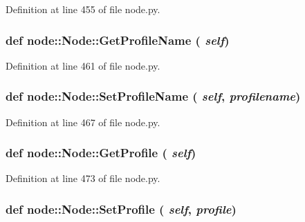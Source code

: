 Definition at line 455 of file node.py.\hypertarget{classnode_1_1Node_20edc3356c0700d5513dfddb4c882ee2}{
\subsubsection[GetProfileName]{\setlength{\rightskip}{0pt plus 5cm}def node::Node::Get\-Profile\-Name ( {\em self})}}
\label{classnode_1_1Node_20edc3356c0700d5513dfddb4c882ee2}




Definition at line 461 of file node.py.\hypertarget{classnode_1_1Node_a138775ce0f4eb9fd4185aaa8f1cbd61}{
\subsubsection[SetProfileName]{\setlength{\rightskip}{0pt plus 5cm}def node::Node::Set\-Profile\-Name ( {\em self},  {\em profilename})}}
\label{classnode_1_1Node_a138775ce0f4eb9fd4185aaa8f1cbd61}




Definition at line 467 of file node.py.\hypertarget{classnode_1_1Node_9620fa2bc377b7e06c39b557c5c73363}{
\subsubsection[GetProfile]{\setlength{\rightskip}{0pt plus 5cm}def node::Node::Get\-Profile ( {\em self})}}
\label{classnode_1_1Node_9620fa2bc377b7e06c39b557c5c73363}




Definition at line 473 of file node.py.\hypertarget{classnode_1_1Node_5b97c9c35ddd35f7d760abe49285d20a}{
\subsubsection[SetProfile]{\setlength{\rightskip}{0pt plus 5cm}def node::Node::Set\-Profile ( {\em self},  {\em profile})}}
\label{classnode_1_1Node_5b97c9c35ddd35f7d760abe49285d20a}




